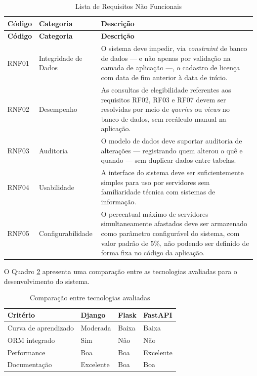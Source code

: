 \begin{longtable}{|p{1.8cm}|p{3cm}|p{9cm}|}
\caption{Lista de Requisitos Não Funcionais}
\label{tab:requisitos_nao_funcionais} \\

\hline
\textbf{Código} & \textbf{Categoria} & \textbf{Descrição} \\
\hline
\endfirsthead

\hline
\textbf{Código} & \textbf{Categoria} & \textbf{Descrição} \\
\hline
\endhead

\hline
\endlastfoot

RNF01 & Integridade de Dados & O sistema deve impedir, via \textit{constraint} de banco de dados — e não apenas por validação na camada de aplicação —, o cadastro de licença com data de fim anterior à data de início. \\ \hline
RNF02 & Desempenho & As consultas de elegibilidade referentes aos requisitos RF02, RF03 e RF07 devem ser resolvidas por meio de \textit{queries} ou \textit{views} no banco de dados, sem recálculo manual na aplicação. \\ \hline
RNF03 & Auditoria & O modelo de dados deve suportar auditoria de alterações — registrando quem alterou o quê e quando — sem duplicar dados entre tabelas. \\ \hline
RNF04 & Usabilidade & A interface do sistema deve ser suficientemente simples para uso por servidores sem familiaridade técnica com sistemas de informação. \\ \hline
RNF05 & Configurabilidade & O percentual máximo de servidores simultaneamente afastados deve ser armazenado como parâmetro configurável do sistema, com valor padrão de 5\%, não podendo ser definido de forma fixa no código da aplicação. \\ \hline

\end{longtable}

O Quadro \ref{quad:tecnologias} apresenta uma comparação entre as tecnologias avaliadas para o desenvolvimento do sistema.

\begin{table}[htb]
\centering
\caption{Comparação entre tecnologias avaliadas}
\label{quad:tecnologias}
\begin{tabular}{|l|l|l|l|}
\hline
\textbf{Critério} & \textbf{Django} & \textbf{Flask} & \textbf{FastAPI} \\ \hline
Curva de aprendizado & Moderada & Baixa & Baixa \\ \hline
ORM integrado & Sim & Não & Não \\ \hline
Performance & Boa & Boa & Excelente \\ \hline
Documentação & Excelente & Boa & Boa \\ \hline
\end{tabular}
\end{table}


